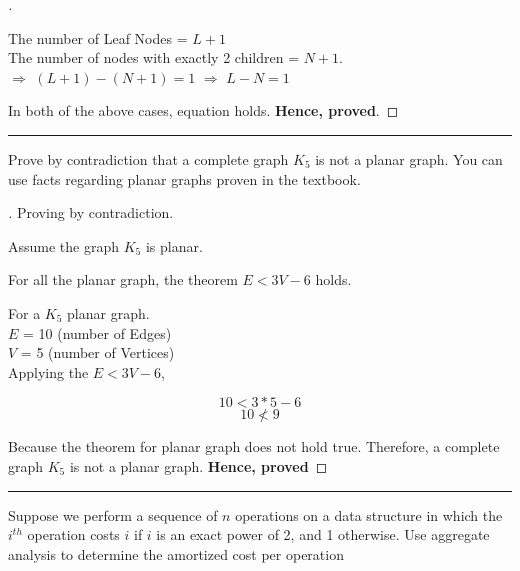 \documentclass[a4paper, 12pt]{article}
\begin{document}
\begin{proof}[\color{red}{Solution}]
\begin{enumerate}
    The number of Leaf Nodes = $L + 1$\\
    The number of nodes with exactly 2 children = $N + 1$. \\
    $\Rightarrow$ $(L + 1) - (N + 1) = 1$
    $\Rightarrow$ $L - N = 1$
\end{enumerate}

In both of the above cases, equation  holds. \textbf{Hence, proved}. 

\end{proof}



\hrule
\bigskip
\begin{question}[4]
Prove by contradiction that a complete graph $K_5$ is not a planar graph. You can use facts
regarding planar graphs proven in the textbook.
\end{question}

\begin{proof}[\color{red}{Solution}]
Proving by contradiction. 
\smallskip

Assume the graph $K_5$ is planar.

For all the planar graph, the theorem $E < 3V - 6$ holds. 
\smallskip

For a $K_5$ planar graph. \\
$E$ = 10 (number of Edges) \\
$V$ = 5 (number of Vertices) \\

Applying the $E < 3V - 6$,

\[ 10 < 3*5 - 6 \tag*{\footnotesize Applying theorem} \] 
\[ 10 \nless 9  \]

Because the theorem for planar graph does not hold true. Therefore, a complete graph $K_5$ is not a planar graph. \textbf{Hence, proved}
\end{proof}
\bigskip


\hrule
\bigskip
\begin{question}[5]
Suppose we perform a sequence of $n$ operations on a data structure in which the $i^{th}$
operation costs $i$ if $i$ is an exact power of 2, and 1 otherwise. Use aggregate analysis to determine
the amortized cost per operation
\end{question}
\end{document}

